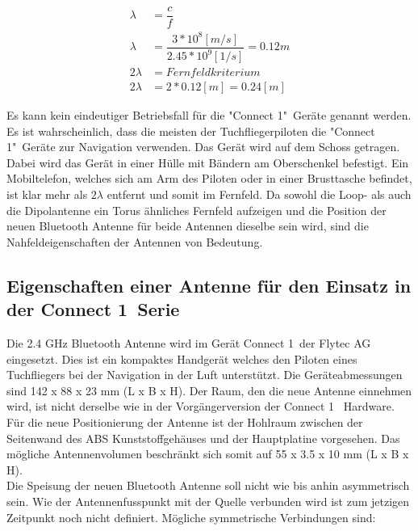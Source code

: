 \begin{eqnarray}
\lambda &=\dfrac{c}{f} \\
\lambda &=\dfrac{3*10^{8} [m/s]}{2.45*10^{9} [1/s]}=0.12m\\ 
2\lambda &= Fernfeldkriterium\\ 
2\lambda &= 2*0.12[m] =0.24 [m] \label{eq:Fernfeld}
\end{eqnarray}

Es kann kein eindeutiger Betriebsfall für die "Connect 1"\  Geräte genannt werden. Es ist wahrscheinlich, dass die meisten der Tuchfliegerpiloten die "Connect 1"\  Geräte zur Navigation verwenden. Das Gerät wird auf dem Schoss getragen. Dabei wird das Gerät in einer Hülle mit Bändern am Oberschenkel befestigt. Ein Mobiltelefon, welches sich am Arm des Piloten oder in einer Brusttasche befindet, ist klar mehr als $2\lambda$ entfernt und somit im Fernfeld. Da sowohl die Loop- als auch die Dipolantenne ein Torus ähnliches Fernfeld aufzeigen und die Position der neuen Bluetooth Antenne für beide Antennen dieselbe sein wird, sind die Nahfeldeigenschaften der Antennen von Bedeutung.

\subsection{Eigenschaften einer Antenne für den Einsatz in der \glqq Connect 1\grqq \  Serie}\label{sec:EigenschaftenAntenne}
Die 2.4 GHz Bluetooth Antenne wird im Gerät \glqq Connect 1\grqq \  der Flytec AG eingesetzt. Dies ist ein kompaktes Handgerät welches den Piloten eines Tuchfliegers bei der Navigation in der Luft unterstützt. Die Geräteabmessungen sind 142 x 88 x 23 mm (L x B x H). Der Raum, den die neue Antenne einnehmen wird, ist nicht derselbe wie in der Vorgängerversion der \glqq Connect 1 \grqq \ Hardware. Für die neue Positionierung der Antenne ist der Hohlraum zwischen der Seitenwand des ABS Kunststoffgehäuses und der Hauptplatine  vorgesehen. Das mögliche Antennenvolumen beschränkt sich somit auf 55 x 3.5 x 10 mm (L x B x H).\\
Die Speisung der neuen Bluetooth Antenne soll nicht wie bis anhin asymmetrisch sein. Wie der Antennenfusspunkt mit der Quelle verbunden wird ist zum jetzigen Zeitpunkt noch nicht definiert. Mögliche symmetrische Verbindungen sind:

